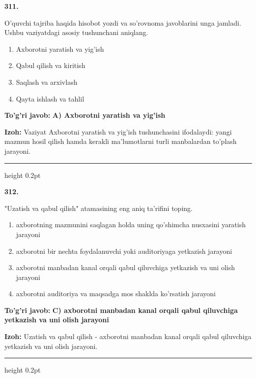 \documentclass[10pt,a4paper,oneside]{article}
\begin{document}
\noindent\textbf{\color{ink}311.}
\par
O'quvchi tajriba haqida hisobot yozdi va so'rovnoma javoblarini unga jamladi. Ushbu vaziyatdagi asosiy tushunchani aniqlang.
\begin{enumerate}[label=\Alph*),leftmargin=9mm]
\item Axborotni yaratish va yig'ish
\item Qabul qilish va kiritish
\item Saqlash va arxivlash
\item Qayta ishlash va tahlil
\end{enumerate}
\begin{tcolorbox}[enhanced,breakable,colback=teal!4,colframe=teal!50!black,boxrule=0.5pt,arc=1.1mm,left=3mm,right=3mm,top=1.7mm,bottom=1.7mm,before skip=2mm,after skip=2mm]
\textbf{\color{teal}To'g'ri javob:} \textbf{A) Axborotni yaratish va yig'ish}
\par\smallskip
\textbf{Izoh:} Vaziyat Axborotni yaratish va yig'ish tushunchasini ifodalaydi: yangi mazmun hosil qilish hamda kerakli ma'lumotlarni turli manbalardan to'plash jarayoni.
\end{tcolorbox}
\vspace{2mm}\hrule height 0.2pt \vspace{3mm}

\noindent\textbf{\color{ink}312.}
\par
"Uzatish va qabul qilish" atamasining eng aniq ta'rifini toping.
\begin{enumerate}[label=\Alph*),leftmargin=9mm]
\item axborotning mazmunini saqlagan holda uning qo'shimcha nusxasini yaratish jarayoni
\item axborotni bir nechta foydalanuvchi yoki auditoriyaga yetkazish jarayoni
\item axborotni manbadan kanal orqali qabul qiluvchiga yetkazish va uni olish jarayoni
\item axborotni auditoriya va maqsadga mos shaklda ko'rsatish jarayoni
\end{enumerate}
\begin{tcolorbox}[enhanced,breakable,colback=teal!4,colframe=teal!50!black,boxrule=0.5pt,arc=1.1mm,left=3mm,right=3mm,top=1.7mm,bottom=1.7mm,before skip=2mm,after skip=2mm]
\textbf{\color{teal}To'g'ri javob:} \textbf{C) axborotni manbadan kanal orqali qabul qiluvchiga yetkazish va uni olish jarayoni}
\par\smallskip
\textbf{Izoh:} Uzatish va qabul qilish - axborotni manbadan kanal orqali qabul qiluvchiga yetkazish va uni olish jarayoni.
\end{tcolorbox}
\vspace{2mm}\hrule height 0.2pt \vspace{3mm}
\end{document}
